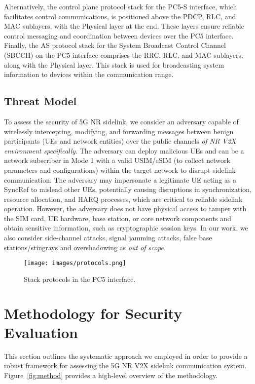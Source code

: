 Alternatively, the control plane protocol stack for the PC5-S interface, which facilitates control communications, is positioned above the PDCP, RLC, and MAC sublayers, with the Physical layer at the end. These layers ensure reliable control messaging and coordination between devices over the PC5 interface. Finally, the AS protocol stack for the System Broadcast Control Channel (SBCCH) on the PC5 interface comprises the RRC, RLC, and MAC sublayers, along with the Physical layer. This stack is used for broadcasting system information to devices within the communication range.

\subsection{Threat Model}

To assess the security of 5G NR sidelink, we consider an adversary capable of wirelessly intercepting, modifying, and forwarding messages between benign participants (UEs and network entities) over the public channels \textit{of NR V2X environment specifically}. The adversary can deploy malicious UEs and can be a network subscriber in Mode 1 with a valid USIM/eSIM (to collect network parameters and configurations) within the target network to disrupt sidelink communication. The adversary may impersonate a legitimate UE acting as a SyncRef to mislead other UEs, potentially causing disruptions in synchronization, resource allocation, and HARQ processes, which are critical to reliable sidelink operation. However, the adversary does not have physical access to tamper with the SIM card, UE hardware, base station, or core network components and obtain sensitive information, such as cryptographic session keys. In our work, we also consider side-channel attacks, signal jamming attacks, false base stations/stingrays and overshadowing as \textit{out of scope}.

\begin{figure}[!t]
     \centering
     \texttt{[image: images/protocols.png]}
     \caption{Stack protocols in the PC5 interface.}
     \label{fig:protocols}
\end{figure}

\section{Methodology for Security Evaluation} \label{sec:methodology}

This section outlines the systematic approach we employed in order to provide a robust framework for assessing the 5G NR V2X sidelink communication system. Figure~\ref{fig:method} provides a high-level overview of the methodology.

